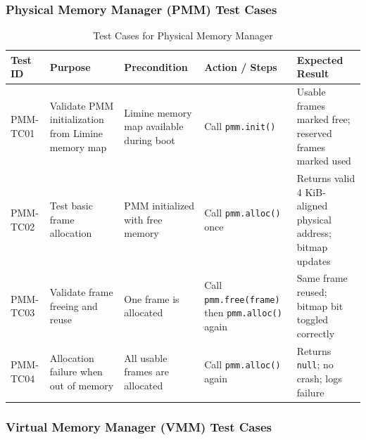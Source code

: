 \documentclass[12pt]{extarticle}
\begin{document}
\subsubsection{Physical Memory Manager (PMM) Test Cases}

\begin{table}[H]
\centering
\renewcommand{\arraystretch}{1.3}
\begin{tabular}{|p{1.4cm}|p{3.2cm}|p{3.0cm}|p{3.4cm}|p{3.4cm}|}
\hline
\textbf{Test ID} & \textbf{Purpose} & \textbf{Precondition} & \textbf{Action / Steps} & \textbf{Expected Result} \\
\hline

PMM-TC01 & Validate PMM initialization from Limine memory map & Limine memory map available during boot & Call \texttt{pmm.init()} & Usable frames marked free; reserved frames marked used \\
\hline

PMM-TC02 & Test basic frame allocation & PMM initialized with free memory & Call \texttt{pmm.alloc()} once & Returns valid 4 KiB-aligned physical address; bitmap updates \\
\hline

PMM-TC03 & Validate frame freeing and reuse & One frame is allocated & Call \texttt{pmm.free(frame)} then \texttt{pmm.alloc()} again & Same frame reused; bitmap bit toggled correctly \\
\hline

PMM-TC04 & Allocation failure when out of memory & All usable frames are allocated & Call \texttt{pmm.alloc()} again & Returns \texttt{null}; no crash; logs failure \\
\hline

\end{tabular}
\caption{Test Cases for Physical Memory Manager}
\label{table:pmm-main-tests}
\end{table}

\subsubsection{Virtual Memory Manager (VMM) Test Cases}
\end{document}
